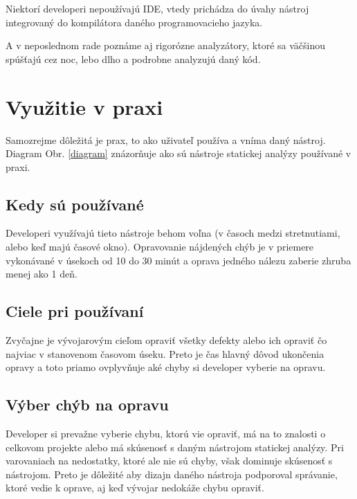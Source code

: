 \documentclass[10pt,twoside,slovak,a4paper]{article}
\begin{document}
Niektorí developeri nepoužívajú IDE, vtedy prichádza do úvahy nástroj integrovaný do
kompilátora daného programovacieho jazyka.

A v neposlednom rade poznáme aj rigorózne analyzátory, ktoré sa väčšinou
spúšťajú cez noc, lebo dlho a podrobne analyzujú daný kód.\cite{BrittanyJohnson, LisaNguyen}

\section{Využitie v praxi} \label{dev}
Samozrejme dôležitá je prax, to ako uživateľ používa a vníma daný nástroj\cite{LisaNguyen}.
Diagram Obr. \ref{diagram} znázorňuje ako sú nástroje statickej analýzy používané v praxi.

\subsection*{Kedy sú používané}
Developeri využívajú tieto nástroje behom voľna (v časoch medzi stretnutiami, alebo keď majú časové okno). Opravovanie
nájdených chýb je v priemere vykonávané v úsekoch od 10 do 30 minút a oprava jedného nálezu zaberie zhruba menej ako 1 deň.

\subsection*{Ciele pri používaní}
Zvyčajne je vývojarovým cieľom opraviť všetky defekty alebo ich opraviť čo najviac v stanovenom časovom úseku. Preto
je čas hlavný dôvod ukončenia opravy a toto priamo ovplyvňuje aké chyby si developer vyberie na opravu.

\subsection*{Výber chýb na opravu}
Developer si prevažne vyberie chybu, ktorú vie opraviť, má na to znalosti o celkovom projekte alebo má skúsenosť s
daným nástrojom statickej analýzy. Pri varovaniach na nedostatky, ktoré ale nie sú chyby, však dominuje skúsenosť
s nástrojom. Preto je dôležité aby dizajn daného nástroja podporoval správanie, ktoré vedie k oprave, aj keď vývojar
nedokáže chybu opraviť.
\end{document}
